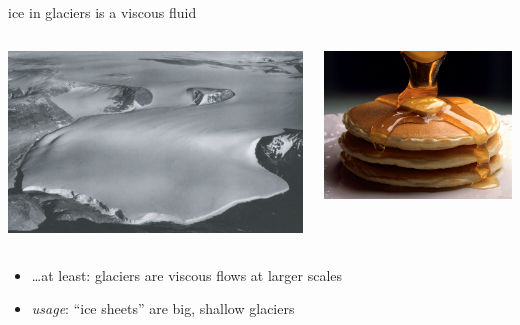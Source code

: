 \documentclass{beamer}
\begin{document}
\begin{frame}{ice in glaciers is a viscous fluid}
\begin{columns}
\begin{column}{0.65\textwidth}
\includegraphics[width=1.0\textwidth]{polaris}
\end{column}
\begin{column}{0.35\textwidth}
\includegraphics[width=1.0\textwidth]{pancakes}
\end{column}
\end{columns}

\bigskip\bigskip
\begin{itemize}
\item \dots at least: glaciers are viscous flows at larger scales
\item \emph{usage}: ``ice sheets'' are big, shallow glaciers
\end{itemize}
\end{frame}
\end{document}
